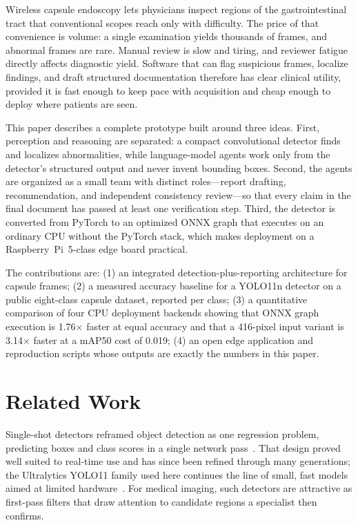 \documentclass[conference]{IEEEtran}
\begin{document}
Wireless capsule endoscopy lets physicians inspect regions of the
gastrointestinal tract that conventional scopes reach only with difficulty.
The price of that convenience is volume: a single examination yields thousands
of frames, and abnormal frames are rare. Manual review is slow and tiring, and
reviewer fatigue directly affects diagnostic yield. Software that can flag
suspicious frames, localize findings, and draft structured documentation
therefore has clear clinical utility, provided it is fast enough to keep pace
with acquisition and cheap enough to deploy where patients are seen.

This paper describes a complete prototype built around three ideas. First,
perception and reasoning are separated: a compact convolutional detector finds
and localizes abnormalities, while language-model agents work only from the
detector's structured output and never invent bounding boxes. Second, the
agents are organized as a small team with distinct roles---report drafting,
recommendation, and independent consistency review---so that every claim in
the final document has passed at least one verification step. Third, the
detector is converted from PyTorch to an optimized ONNX graph that executes on
an ordinary CPU without the PyTorch stack, which makes deployment on a
Raspberry~Pi~5-class edge board practical.

The contributions are: (1) an integrated detection-plus-reporting architecture
for capsule frames; (2) a measured accuracy baseline for a YOLO11n detector on
a public eight-class capsule dataset, reported per class; (3) a quantitative
comparison of four CPU deployment backends showing that ONNX graph execution
is 1.76$\times$ faster at equal accuracy and that a 416-pixel input variant is
3.14$\times$ faster at a mAP50 cost of 0.019; (4) an open edge application and
reproduction scripts whose outputs are exactly the numbers in this paper.

\section{Related Work}
\label{sec:related}

Single-shot detectors reframed object detection as one regression problem,
predicting boxes and class scores in a single network pass~\cite{yolo2016}.
That design proved well suited to real-time use and has since been refined
through many generations; the Ultralytics YOLO11 family used here continues
the line of small, fast models aimed at limited hardware~\cite{yolo11docs}.
For medical imaging, such detectors are attractive as first-pass filters that
draw attention to candidate regions a specialist then confirms.
\end{document}
